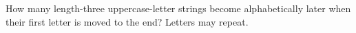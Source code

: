 How many length-three uppercase-letter strings become alphabetically later when their first letter is moved to the end? Letters may repeat.
